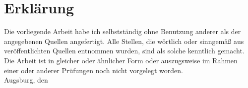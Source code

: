 \chapter*{Erklärung}
Die vorliegende Arbeit habe ich selbstständig ohne Benutzung anderer als der
angegebenen Quellen angefertigt. Alle Stellen, die wörtlich oder sinngemäß
aus veröffentlichten Quellen entnommen wurden, sind als solche
kenntlich gemacht. Die Arbeit ist in gleicher oder ähnlicher Form oder
auszugsweise im Rahmen einer oder anderer Prüfungen noch nicht vorgelegt
worden.
\\[2cm]
Augsburg, den \eingereicht\hfill \namedesautors